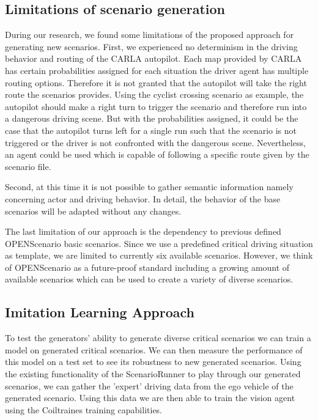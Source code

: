 \documentclass[conference, 11pt]{IEEEtran}
\begin{document}
\subsection{Limitations of scenario generation}
During our research, we found some limitations of the proposed approach for generating new scenarios. First, we experienced no determinism in the driving behavior and routing of the CARLA autopilot. Each map provided by CARLA has certain probabilities assigned for each situation the driver agent has multiple routing options. Therefore it is not granted that the autopilot will take the right route the scenarios provides. Using the cyclist crossing scenario as example, the autopilot should make a right turn to trigger the scenario and therefore run into a dangerous driving scene. But with the probabilities assigned, it could be the case that the autopilot turns left for a single run such that the scenario is not triggered or the driver is not confronted with the dangerous scene. Nevertheless, an agent could be used which is capable of following a specific route given by the scenario file.

Second, at this time it is not possible to gather semantic information namely concerning actor and driving behavior. In detail, the behavior of the base scenarios will be adapted without any changes.  

The last limitation of our approach is the dependency to previous defined OPENScenario basic scenarios. Since we use a predefined critical driving situation as template, we are limited to currently six available scenarios. However, we think of OPENScenario as a future-proof standard including a growing amount of available scenarios which can be used to create a variety of diverse scenarios.

\subsection{Imitation Learning Approach}
To test the generators' ability to generate diverse critical scenarios we can train a model on generated critical scenarios. We can then measure the performance of this model on a test set to see its robustness to new generated scenarios. Using the existing functionality of the ScenarioRunner to play through our generated scenarios, we can gather the 'expert' driving data from the ego vehicle of the generated scenario. Using this data we are then able to train the vision agent using the Coiltraines training capabilities.
\end{document}
